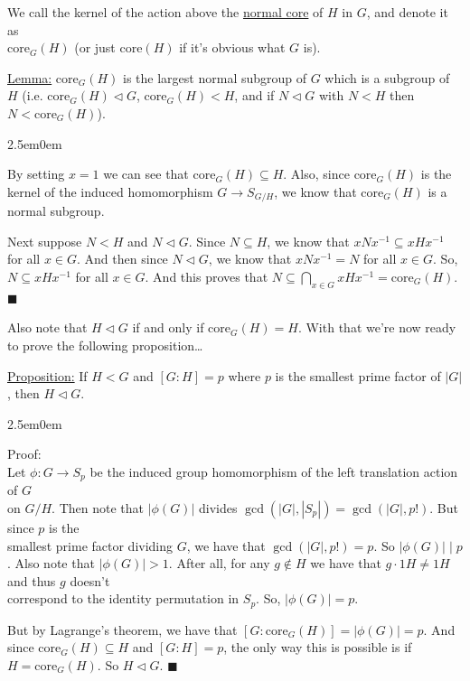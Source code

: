 \documentclass{book}
\newcommand{\hTwo}{%
\color{Black}%
   \fontsize{13}{15}\selectfont%
}
\newcommand{\exTwo}{%
   \color{Purple}%
   \fontsize{13}{15}\selectfont%
}
\newcommand{\exThreeP}{%
   \color{RedViolet}%
   \fontsize{12}{14}\selectfont%
}
\newenvironment{myIndent}{%
   \begin{adjustwidth}{2.5em}{0em}%
}{%
   \end{adjustwidth}%
}
\newcommand{\udefine}[1]{{%
   \setulcolor{Red}%
   \setul{0.14em}{0.07em}%
   \ul{#1}%
}}
\newcommand{\divides}{\mathop{\mid}}
\newcommand{\core}{\mathrm{core}}
\newcommand{\retTwo}{\hfill\bigbreak}
\begin{document}
We call the kernel of the action above the \udefine{normal core} of $H$ in $G$, and denote it as\\ $\core_G(H)$ (or just $\core(H)$ if it's obvious what $G$ is).\retTwo

\exTwo\ul{Lemma:} $\core_G(H)$ is the largest normal subgroup of $G$ which is a subgroup of $H$ (i.e. $\core_G(H) \lhd G$, $\core_G(H) < H$, and if $N \lhd G$ with $N < H$ then $N < \core_G(H)$).

\begin{myIndent}\exThreeP
	By setting $x = 1$ we can see that $\core_G(H) \subseteq H$. Also, since $\core_G(H)$ is the kernel of the induced homomorphism $G \to S_{G/H}$, we know that $\core_G(H)$ is a normal subgroup.\retTwo

	Next suppose $N < H$ and $N \lhd G$. Since $N \subseteq H$, we know that $xNx^{-1} \subseteq xHx^{-1}$\\ for all $x \in G$. And then since $N \lhd G$, we know that $xNx^{-1} = N$ for all $x \in G$. So,\\ $N \subseteq xHx^{-1}$ for all $x \in G$. And this proves that $N \subseteq \bigcap_{x \in G} xHx^{-1} = \core_G(H)$. $\blacksquare$\retTwo
\end{myIndent}

\hTwo Also note that $H \lhd G$ if and only if $\core_G(H) = H$. With that we're now ready to prove the following proposition\dots\retTwo

\exTwo\ul{Proposition:} If $H < G$ and $[G : H] = p$ where $p$ is the smallest prime factor of $|G|$, then $H \lhd G$.
\begin{myIndent}\exThreeP
	Proof:\\
	Let $\phi: G \to S_p$ be the induced group homomorphism of the left translation action of $G$\\ [1pt] on $G/H$. Then note that $|\phi(G)|$ divides $\gcd(|G|, |S_p|) = \gcd(|G|, p!)$. But since $p$ is the\\ [1pt] smallest prime factor dividing $G$, we have that $\gcd(|G|, p !) = p$. So $|\phi(G)| \divides p$. Also note that $|\phi(G)| > 1$. After all, for any $g \notin H$ we have that $g \cdot 1H \neq 1H$ and thus $g$ doesn't\\ correspond to the identity permutation in $S_p$. So, $|\phi(G)| = p$.\retTwo

	But by Lagrange's theorem, we have that $[G: \core_G(H)] = |\phi(G)| = p$. And since $\core_G(H) \subseteq H$ and $[G : H] = p$, the only way this is possible is if $H = \core_G(H)$. So $H \lhd G$. $\blacksquare$\retTwo
\end{myIndent}
\end{document}
